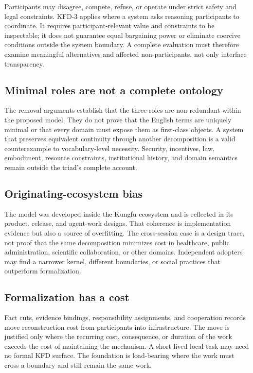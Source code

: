 Participants may disagree, compete, refuse, or operate under strict safety and
legal constraints. KFD-3 applies where a system asks reasoning participants to
coordinate. It requires participant-relevant value and constraints to be
inspectable; it does not guarantee equal bargaining power or eliminate
coercive conditions outside the system boundary. A complete evaluation must
therefore examine meaningful alternatives and affected non-participants, not
only interface transparency.

\subsection{Minimal roles are not a complete ontology}

The removal arguments establish that the three roles are non-redundant within
the proposed model. They do not prove that the English terms are uniquely
minimal or that every domain must expose them as first-class objects. A system
that preserves equivalent continuity through another decomposition is a valid
counterexample to vocabulary-level necessity. Security, incentives, law,
embodiment, resource constraints, institutional history, and domain semantics
remain outside the triad's complete account.

\subsection{Originating-ecosystem bias}

The model was developed inside the Kungfu ecosystem and is reflected in its
product, release, and agent-work designs. That coherence is implementation
evidence but also a source of overfitting. The cross-session case is a design
trace, not proof that the same decomposition minimizes cost in healthcare,
public administration, scientific collaboration, or other domains.
Independent adopters may find a narrower kernel, different boundaries, or
social practices that outperform formalization.

\subsection{Formalization has a cost}

Fact cuts, evidence bindings, responsibility assignments, and cooperation
records move reconstruction cost from participants into infrastructure. The
move is justified only where the recurring cost, consequence, or duration of
the work exceeds the cost of maintaining the mechanism. A short-lived local
task may need no formal KFD surface. The foundation is load-bearing where the
work must cross a boundary and still remain the same work.
